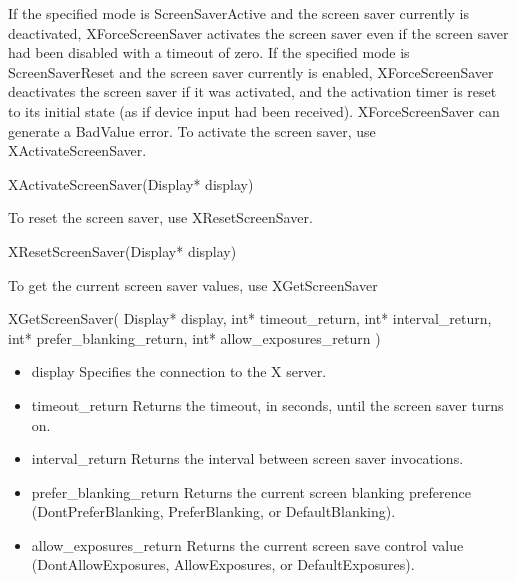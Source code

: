 \documentclass{report}
\begin{document}
\begin{itemize}
\begin{itemize}
            \end{itemize}
            If the specified mode is ScreenSaverActive and the screen saver currently is deactivated, XForceScreenSaver activates the screen saver even if the screen saver had been disabled with a timeout of zero. If the specified mode is ScreenSaverReset and the screen saver currently is enabled, XForceScreenSaver deactivates the screen saver if it was activated, and the activation timer is reset to its initial state (as if device input had been received).
            \bigbreak \noindent 
            XForceScreenSaver can generate a BadValue error.
            \bigbreak \noindent 
            To activate the screen saver, use XActivateScreenSaver.
            \begin{cppcode}
                XActivateScreenSaver(Display* display)
            \end{cppcode}
            \bigbreak \noindent 
            To reset the screen saver, use XResetScreenSaver.
            \bigbreak \noindent 
            \begin{cppcode}
                XResetScreenSaver(Display* display)
            \end{cppcode}
            \bigbreak \noindent 
            To get the current screen saver values, use XGetScreenSaver
            \bigbreak \noindent 
            \begin{cppcode}
                XGetScreenSaver(
                    Display* display,
                    int* timeout_return,
                    int* interval_return,
                    int* prefer_blanking_return,
                    int* allow_exposures_return
                )
            \end{cppcode}
            \begin{itemize}
                \item display Specifies the connection to the X server.
                \item timeout\_return Returns the timeout, in seconds, until the screen saver turns on.
                \item interval\_return Returns the interval between screen saver invocations.
                \item prefer\_blanking\_return Returns the current screen blanking preference (DontPreferBlanking, PreferBlanking, or DefaultBlanking).
                \item allow\_exposures\_return Returns the current screen save control value (DontAllowExposures, AllowExposures, or DefaultExposures).
            \end{itemize}



    \end{itemize}
\end{document}
